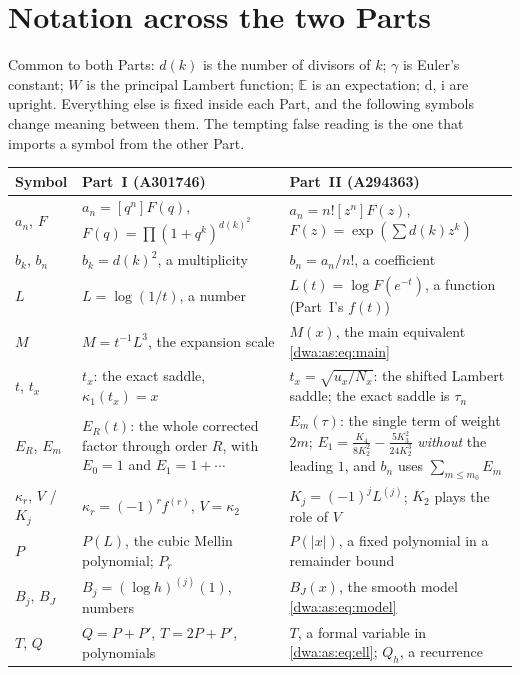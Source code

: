 \documentclass[11pt,letterpaper]{article}
\numberwithin{equation}{section}
\theoremstyle{remark}
\newcommand{\dd}{\mathrm d}
\newcommand{\ii}{\mathrm i}
\newcommand{\E}{\mathbb E}
\begin{document}
\section*{Notation across the two Parts}\label{dwa:sec:notation}
Common to both Parts: $d(k)$ is the number of divisors of $k$; $\gamma$ is Euler's constant; $W$ is the principal Lambert function; $\E$ is an expectation; $\dd$, $\ii$ are upright. Everything else is fixed inside each Part, and the following symbols change meaning between them. The tempting false reading is the one that imports a symbol from the other Part.
\begin{center}
\small
\begin{tabular}{@{}>{\raggedright\arraybackslash}p{} >{\raggedright\arraybackslash}p{} >{\raggedright\arraybackslash}p{}@{}}
\toprule
Symbol & Part~I (A301746) & Part~II (A294363)\\
\midrule
$a_n$, $F$ & $a_n=[q^n]F(q)$, $F(q)=\prod(1+q^k)^{d(k)^2}$ & $a_n=n![z^n]F(z)$, $F(z)=\exp(\sum d(k)z^k)$\\
$b_k$, $b_n$ & $b_k=d(k)^2$, a multiplicity & $b_n=a_n/n!$, a coefficient\\
$L$ & $L=\log(1/t)$, a number & $L(t)=\log F(e^{-t})$, a function (Part~I's $f(t)$)\\
$M$ & $M=t^{-1}L^3$, the expansion scale & $M(x)$, the main equivalent \eqref{dwa:as:eq:main}\\
$t$, $t_x$ & $t_x$: the exact saddle, $\kappa_1(t_x)=x$ & $t_x=\sqrt{u_x/N_x}$: the shifted Lambert saddle; the exact saddle is $\tau_n$\\
$E_R$, $E_m$ & $E_R(t)$: the whole corrected factor through order $R$, with $E_0=1$ and $E_1=1+\cdots$ & $E_m(\tau)$: the single term of weight $2m$; $E_1=\frac{K_4}{8K_2^2}-\frac{5K_3^2}{24K_2^3}$ \emph{without} the leading $1$, and $b_n$ uses $\sum_{m\le m_0}E_m$\\
$\kappa_r$, $V$ / $K_j$ & $\kappa_r=(-1)^rf^{(r)}$, $V=\kappa_2$ & $K_j=(-1)^jL^{(j)}$; $K_2$ plays the role of $V$\\
$P$ & $P(L)$, the cubic Mellin polynomial; $P_r$ & $P(|x|)$, a fixed polynomial in a remainder bound\\
$B_j$, $B_J$ & $B_j=(\log h)^{(j)}(1)$, numbers & $B_J(x)$, the smooth model \eqref{dwa:as:eq:model}\\
$T$, $Q$ & $Q=P+P'$, $T=2P+P'$, polynomials & $T$, a formal variable in \eqref{dwa:as:eq:ell}; $Q_h$, a recurrence\\

\end{tabular}
\end{center}
\end{document}
